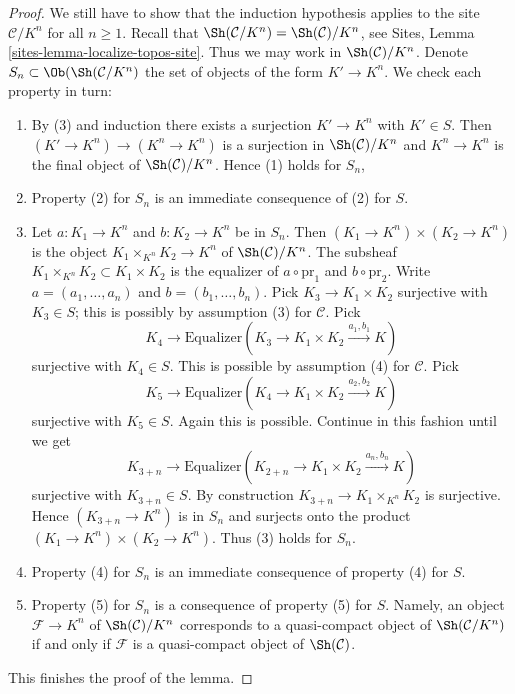 \begin{proof}
\medskip\noindent
We still have to show that the induction hypothesis applies
to the site $\mathcal{C}/K^n$ for all $n \geq 1$. Recall
that $\Sh(\mathcal{C}/K^n) = \Sh(\mathcal{C})/K^n$, see
Sites, Lemma \ref{sites-lemma-localize-topos-site}.
Thus we may work in $\Sh(\mathcal{C})/K^n$.
Denote $S_n \subset \Ob(\Sh(\mathcal{C}/K^n)$ the set
of objects of the form $K' \to K^n$. We check each property in turn:
\begin{enumerate}
\item By (3) and induction there exists a surjection
$K' \to K^n$ with $K' \in S$. Then $(K' \to K^n) \to (K^n \to K^n)$
is a surjection in $\Sh(\mathcal{C})/K^n$ and $K^n \to K^n$
is the final object of $\Sh(\mathcal{C})/K^n$. Hence (1) holds for $S_n$,
\item Property (2) for $S_n$ is an immediate consequence
of (2) for $S$.
\item Let $a : K_1 \to K^n$ and $b : K_2 \to K^n$ be in $S_n$.
Then $(K_1 \to K^n) \times (K_2 \to K^n)$ is the object
$K_1 \times_{K^n} K_2 \to K^n$ of $\Sh(\mathcal{C})/K^n$.
The subsheaf $K_1 \times_{K^n} K_2 \subset K_1 \times K_2$ is the
equalizer of $a \circ \text{pr}_1$ and $b \circ \text{pr}_2$.
Write $a = (a_1, \ldots, a_n)$ and $b = (b_1, \ldots, b_n)$.
Pick $K_3 \to K_1 \times K_2$ surjective with $K_3 \in S$;
this is possibly by assumption (3) for $\mathcal{C}$.
Pick
$$
K_4
\longrightarrow
\text{Equalizer}(K_3 \to K_1 \times K_2 \xrightarrow{a_1, b_1} K)
$$
surjective with $K_4 \in S$.
This is possible by assumption (4) for $\mathcal{C}$.
Pick
$$
K_5
\longrightarrow
\text{Equalizer}(K_4 \to K_1 \times K_2 \xrightarrow{a_2, b_2} K)
$$
surjective with $K_5 \in S$.
Again this is possible. Continue in this fashion until we get
$$
K_{3 + n}
\longrightarrow
\text{Equalizer}(K_{2 + n} \to K_1 \times K_2 \xrightarrow{a_n, b_n} K)
$$
surjective with $K_{3 + n} \in S$. By construction
$K_{3 + n} \to K_1 \times_{K^n} K_2$
is surjective. Hence $(K_{3 + n} \to K^n)$ is in $S_n$ and
surjects onto the product $(K_1 \to K^n) \times (K_2 \to K^n)$.
Thus (3) holds for $S_n$.
\item Property (4) for $S_n$ is an immediate consequence of
property (4) for $S$.
\item Property (5) for $S_n$ is a consequence of
property (5) for $S$. Namely, an object $\mathcal{F} \to K^n$ of
$\Sh(\mathcal{C})/K^n$ corresponds to a quasi-compact object of
$\Sh(\mathcal{C}/K^n)$ if and only if $\mathcal{F}$ is a
quasi-compact object of $\Sh(\mathcal{C})$.
\end{enumerate}
This finishes the proof of the lemma.
\end{proof}

